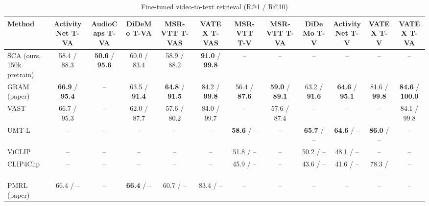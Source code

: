 \begin{table}[t]
\centering
\caption{Fine-tuned video-to-text retrieval (R@1 / R@10)}
\label{tab:finetune_v2t}
\small
\begin{tabular}{lccccccccccc}
\toprule
Method & ActivityNet T-VA & AudioCaps T-VA & DiDeMo T-VA & MSR-VTT T-VAS & VATEX T-VAS & MSR-VTT T-V & MSR-VTT T-VA & DiDeMo T-V & ActivityNet T-V & VATEX T-V & VATEX T-VA \\
\midrule
SCA (ours, 150k pretrain) & 58.4 / 88.3 & \textbf{50.6} / \textbf{95.6} & 60.0 / 83.4 & 58.9 / 88.2 & \textbf{91.0} / \textbf{99.8} & -- & -- & -- & -- & -- & -- \\
GRAM (paper) & \textbf{66.9} / \textbf{95.4} & -- & 63.5 / \textbf{91.4} & \textbf{64.8} / \textbf{91.5} & 84.2 / \textbf{99.8} & 56.4 / \textbf{87.6} & \textbf{59.0} / \textbf{89.1} & 63.2 / \textbf{91.6} & \textbf{64.6} / \textbf{95.1} & 81.6 / \textbf{99.8} & \textbf{84.6} / \textbf{100.0} \\
VAST & 66.7 / 95.3 & -- & 62.0 / 87.7 & 57.6 / 80.2 & 84.0 / 99.7 & -- & 57.6 / 87.4 & -- & -- & -- & 84.1 / 99.8 \\
UMT-L & -- & -- & -- & -- & -- & \textbf{58.6} / -- & -- & \textbf{65.7} / -- & \textbf{64.6} / -- & \textbf{86.0} / -- & -- \\
ViCLIP & -- & -- & -- & -- & -- & 51.8 / -- & -- & 50.2 / -- & 48.1 / -- & -- & -- \\
CLIP4Clip & -- & -- & -- & -- & -- & 45.9 / -- & -- & 43.6 / -- & 41.6 / -- & 78.3 / -- & -- \\
PMRL (paper) & 66.4 / -- & -- & \textbf{66.4} / -- & 60.7 / -- & 83.4 / -- & -- & -- & -- & -- & -- & -- \\
\bottomrule
\end{tabular}
\end{table}
